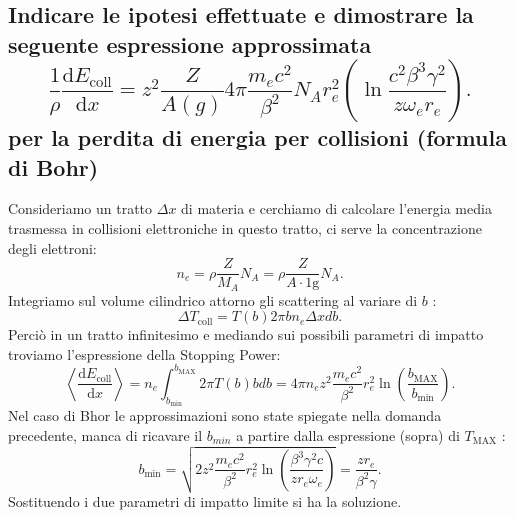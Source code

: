 \subsection[]{Indicare le ipotesi effettuate e dimostrare la seguente espressione approssimata
\[
	\frac{1}{\rho}\frac{\mbox{d} E_{\text{coll}}}{\mbox{d} x} = z^2 \frac{Z}{A\left( g \right) } 4 \pi \frac{m_e c^2}{\beta^2}N_A r_e^2\left( \ln \frac{c^2\beta^3\gamma^2}{z \omega_e r_e} \right) 
.\] 
 per la perdita di energia per collisioni (formula di Bohr)
}
\label{sec:4.b.15}
Consideriamo un tratto $\Delta x$ di materia e cerchiamo di calcolare l'energia media trasmessa in collisioni elettroniche in questo tratto, ci serve la concentrazione degli elettroni:
\[
	n_e =\rho \frac{Z}{M_A}N_A = \rho \frac{Z}{A\cdot 1\text{g}}N_A
.\] 
Integriamo sul volume cilindrico attorno gli scattering al variare di $b$ :
\[
	\Delta T_{\text{coll}} =T\left( b \right) 2 \pi b n_e \Delta x db
.\] 
Perciò in un tratto infinitesimo e mediando sui possibili parametri di impatto troviamo l'espressione della Stopping Power:
\[
	\left< \frac{\mbox{d} E_{\text{coll}}}{\mbox{d} x} \right> = n_e \int_{b_{\text{min}}}^{b_{\text{MAX}}} 2 \pi T\left( b \right) b db = 
	4 \pi n_e z^2 \frac{m_e c^2}{\beta^2} r_e^2 \ln\left( \frac{b_{\text{MAX}}}{b_{\text{min}}} \right) 
.\] 
Nel caso di Bhor le approssimazioni sono state spiegate nella domanda precedente, manca di ricavare il $b_{min}$ a partire dalla espressione (sopra) di $T_{\text{MAX}}$ :
\[
	b_{\text{min}}= \sqrt{2z^2 \frac{m_e c^2}{\beta^2}r_e^2 \ln\left( \frac{\beta^3\gamma^2c}{zr_e\omega_e} \right) } =
	\frac{zr_e}{\beta^2 \gamma}
.\] 	
Sostituendo i due parametri di impatto limite si ha la soluzione.

